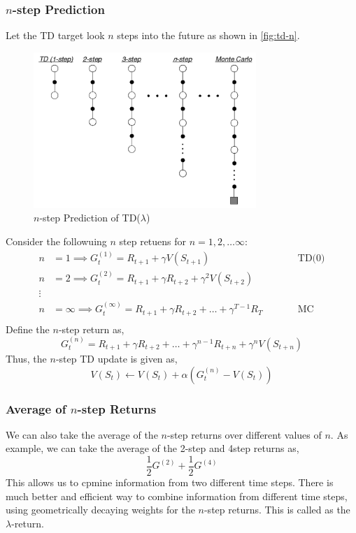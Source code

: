\subsubsection{\(n\)-step Prediction}
Let the TD target look \(n\) steps into the future as shown in \autoref{fig:td-n}.
\begin{figure}[H]
    \centering
    \includegraphics[width=0.75\textwidth]{figures/td-n.png}
    \caption{\(n\)-step Prediction of TD(\(\lambda \))}
    \label{fig:td-n}
\end{figure}
Consider the followuing \(n\) step retuens for \(n = 1, 2, \dots \infty \):
\[
    \begin{aligned}
        n & = 1 \implies  G_t^{(1)} = R_{t+1} + \gamma V(S_{t+1}) &&\qquad \text{TD(0)} \\
        n & = 2 \implies  G_t^{(2)} = R_{t+1} + \gamma R_{t+2} + \gamma^2 V(S_{t+2}) \\
        \vdots \\
        n & = \infty \implies  G_t^{(\infty)} = R_{t+1} + \gamma R_{t+2} + \dots + \gamma^{T-1}R_T
        &&\qquad \text{MC} \\
    \end{aligned}
\]
Define the \(n\)-step return as,
\[
    G_t^{(n)} = R_{t+1} + \gamma R_{t+2} + \dots + \gamma^{n-1}R_{t+n} + \gamma^n V(S_{t+n})
\]
Thus, the \(n\)-step TD update is given as,
\[
    V(S_t) \leftarrow V(S_t) + \alpha\left( 
        G_t^{(n)} - V(S_t)
     \right)
\]

\subsubsection*{Average of \(n\)-step Returns}
We can also take the average of the \(n\)-step returns over different values of \(n\).
As example, we can take the average of the 2-step and 4step returns as,
\[
    \frac{1}{2}G^{(2)} + \frac{1}{2}G^{(4)}
\]
This allows us to cpmine information from two different time steps. There is much better
and efficient way to combine information from different time steps, using geometrically
decaying weights for the \(n\)-step returns. This is called as the \(\lambda\)-return.

